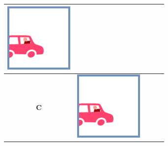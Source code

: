 \documentclass[12pt, a4paper]{article}
\begin{document}
\begin{minipage}{\textwidth}
\begin{table}[H]
\begin{tabulary}{\linewidth}{|C|CCCC|}
				\vspace{0.01cm}\includegraphics[width=\linewidth]{option1}
				\\ \hline
				\textbf{C} &
				\vspace{0.01cm}\includegraphics[width=\linewidth]{option1} &

\end{tabulary}
\end{table}
\end{minipage}
\end{document}
